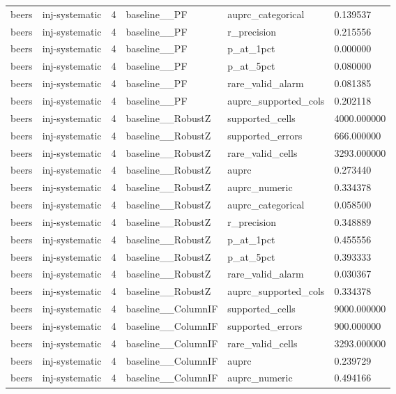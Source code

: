 \begin{tabular}{llllll}
beers & inj-systematic & 4 & baseline\_\_PF & auprc\_categorical & 0.139537 \\
beers & inj-systematic & 4 & baseline\_\_PF & r\_precision & 0.215556 \\
beers & inj-systematic & 4 & baseline\_\_PF & p\_at\_1pct & 0.000000 \\
beers & inj-systematic & 4 & baseline\_\_PF & p\_at\_5pct & 0.080000 \\
beers & inj-systematic & 4 & baseline\_\_PF & rare\_valid\_alarm & 0.081385 \\
beers & inj-systematic & 4 & baseline\_\_PF & auprc\_supported\_cols & 0.202118 \\
beers & inj-systematic & 4 & baseline\_\_RobustZ & supported\_cells & 4000.000000 \\
beers & inj-systematic & 4 & baseline\_\_RobustZ & supported\_errors & 666.000000 \\
beers & inj-systematic & 4 & baseline\_\_RobustZ & rare\_valid\_cells & 3293.000000 \\
beers & inj-systematic & 4 & baseline\_\_RobustZ & auprc & 0.273440 \\
beers & inj-systematic & 4 & baseline\_\_RobustZ & auprc\_numeric & 0.334378 \\
beers & inj-systematic & 4 & baseline\_\_RobustZ & auprc\_categorical & 0.058500 \\
beers & inj-systematic & 4 & baseline\_\_RobustZ & r\_precision & 0.348889 \\
beers & inj-systematic & 4 & baseline\_\_RobustZ & p\_at\_1pct & 0.455556 \\
beers & inj-systematic & 4 & baseline\_\_RobustZ & p\_at\_5pct & 0.393333 \\
beers & inj-systematic & 4 & baseline\_\_RobustZ & rare\_valid\_alarm & 0.030367 \\
beers & inj-systematic & 4 & baseline\_\_RobustZ & auprc\_supported\_cols & 0.334378 \\
beers & inj-systematic & 4 & baseline\_\_ColumnIF & supported\_cells & 9000.000000 \\
beers & inj-systematic & 4 & baseline\_\_ColumnIF & supported\_errors & 900.000000 \\
beers & inj-systematic & 4 & baseline\_\_ColumnIF & rare\_valid\_cells & 3293.000000 \\
beers & inj-systematic & 4 & baseline\_\_ColumnIF & auprc & 0.239729 \\
beers & inj-systematic & 4 & baseline\_\_ColumnIF & auprc\_numeric & 0.494166 \\

\end{tabular}
